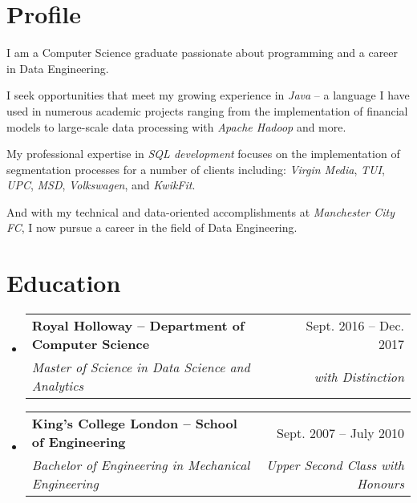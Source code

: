 \documentclass[letterpaper,11pt]{article}
\makeatletter
\newcommand{\resumeSubheading}[4]{
	\vspace{-1pt}\item
	\begin{tabular*}{0.97\textwidth}{l@{\extracolsep{\fill}}r}
		\textbf{#1} & #2 \\
		\textit{\small#3} & \textit{\small #4} \\
	\end{tabular*}\vspace{-5pt}
}
\newcommand{\resumeSubHeadingListStart}{\begin{itemize}[leftmargin=*]}
\newcommand{\resumeSubHeadingListEnd}{\end{itemize}}
\makeatother
\begin{document}
\begin{minipage}[c]{0.8\linewidth}
	\section{Profile}
	\begin{multicols}{2}
		\quad
		I am a Computer Science graduate passionate about programming and a career in Data Engineering.
		\par\quad
		I seek opportunities that meet my growing experience in \textit{Java} -- a language I have used in numerous academic projects ranging from the implementation of financial models to large-scale data processing with \textit{Apache Hadoop} and more.

		\columnbreak
		\par\quad
		My professional expertise in \textit{SQL development} focuses on the implementation of segmentation processes for a number of clients including: \textit{Virgin Media}, \textit{TUI}, \textit{UPC}, \textit{MSD}, \textit{Volkswagen}, and \textit{KwikFit}.
		\par\quad
		And with my technical and data-oriented accomplishments at \textit{Manchester City FC}, I now pursue a career in the field of Data Engineering.

	\end{multicols}
	\vspace{0.5cm}
	\section{Education}
	\resumeSubHeadingListStart

	\resumeSubheading
	{Royal Holloway -- Department of Computer Science}{Sept. 2016 -- Dec. 2017}
	{Master of Science in Data Science and Analytics}{with Distinction}

	\resumeSubheading
	{King's College London -- School of Engineering}{Sept. 2007 -- July 2010}
	{Bachelor of Engineering in Mechanical Engineering}{Upper Second Class with Honours}

	\resumeSubHeadingListEnd
\end{minipage} %
\end{document}
